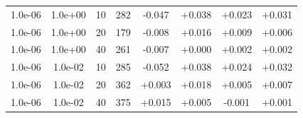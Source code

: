 \documentclass[11pt,a4paper]{article}
\begin{document}
\begin{table}
{\begin{tabular}{*{8}c}
   
 1.0e-06 	 & 1.0e+00 	 & 10 & 282 	 & -0.047 & +0.038 & +0.023 & +0.031 \\ 
  1.0e-06 	 & 1.0e+00 	 & 20 & 179 	 & -0.008 & +0.016 & +0.009 & +0.006 \\ 
  1.0e-06 	 & 1.0e+00 	 & 40 & 261 	 & -0.007 & +0.000 & +0.002 & +0.002 \\ 
 
  

 1.0e-06 	 & 1.0e-02 	 & 10 & 285 	 & -0.052 & +0.038 & +0.024 & +0.032 \\ 
 1.0e-06 	 & 1.0e-02 	 & 20 & 362 	 & +0.003 & +0.018 & +0.005 & +0.007 \\ 
 1.0e-06 	 & 1.0e-02 	 & 40 & 375 	 & +0.015 & +0.005 & -0.001 & +0.001 \\ 
\end{tabular}}
\label{TAB::double}
\end{table} 
\end{document}

